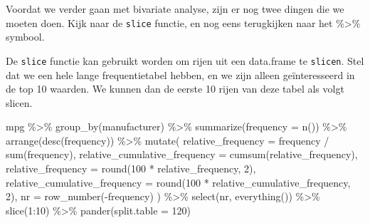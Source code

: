 \documentclass[]{tufte-book}
\newenvironment{Shaded}{}{}
\newcommand{\AttributeTok}[1]{\textcolor[rgb]{0.49,0.56,0.16}{#1}}
\newcommand{\DecValTok}[1]{\textcolor[rgb]{0.25,0.63,0.44}{#1}}
\newcommand{\FunctionTok}[1]{\textcolor[rgb]{0.02,0.16,0.49}{#1}}
\newcommand{\NormalTok}[1]{#1}
\newcommand{\SpecialCharTok}[1]{\textcolor[rgb]{0.25,0.44,0.63}{#1}}
\begin{document}
Voordat we verder gaan met bivariate analyse, zijn er nog twee dingen die we moeten doen. Kijk naar de \texttt{slice} functie, en nog eens terugkijken naar het \%\textgreater\% symbool.

De \texttt{slice} functie kan gebruikt worden om rijen uit een data.frame te \texttt{slicen}. Stel dat we een hele lange frequentietabel hebben, en we zijn alleen geïnteresseerd in de top 10 waarden. We kunnen dan de eerste 10 rijen van deze tabel als volgt slicen.

\begin{Shaded}
\begin{Highlighting}[]
\NormalTok{mpg }\SpecialCharTok{\%\textgreater{}\%}
  \FunctionTok{group\_by}\NormalTok{(manufacturer) }\SpecialCharTok{\%\textgreater{}\%}
  \FunctionTok{summarize}\NormalTok{(}\AttributeTok{frequency =} \FunctionTok{n}\NormalTok{()) }\SpecialCharTok{\%\textgreater{}\%}
  \FunctionTok{arrange}\NormalTok{(}\FunctionTok{desc}\NormalTok{(frequency)) }\SpecialCharTok{\%\textgreater{}\%}
  \FunctionTok{mutate}\NormalTok{(}
    \AttributeTok{relative\_frequency =}\NormalTok{ frequency }\SpecialCharTok{/} \FunctionTok{sum}\NormalTok{(frequency),}
    \AttributeTok{relative\_cumulative\_frequency =} \FunctionTok{cumsum}\NormalTok{(relative\_frequency),}
    \AttributeTok{relative\_frequency =} \FunctionTok{round}\NormalTok{(}\DecValTok{100} \SpecialCharTok{*}\NormalTok{ relative\_frequency, }\DecValTok{2}\NormalTok{),}
    \AttributeTok{relative\_cumulative\_frequency =} \FunctionTok{round}\NormalTok{(}\DecValTok{100} \SpecialCharTok{*}\NormalTok{ relative\_cumulative\_frequency, }\DecValTok{2}\NormalTok{),}
    \AttributeTok{nr =} \FunctionTok{row\_number}\NormalTok{(}\SpecialCharTok{{-}}\NormalTok{frequency)}
\NormalTok{  ) }\SpecialCharTok{\%\textgreater{}\%}
  \FunctionTok{select}\NormalTok{(nr, }\FunctionTok{everything}\NormalTok{()) }\SpecialCharTok{\%\textgreater{}\%}
  \FunctionTok{slice}\NormalTok{(}\DecValTok{1}\SpecialCharTok{:}\DecValTok{10}\NormalTok{) }\SpecialCharTok{\%\textgreater{}\%}
  \FunctionTok{pander}\NormalTok{(}\AttributeTok{split.table =} \DecValTok{120}\NormalTok{)}
\end{Highlighting}
\end{Shaded}
\end{document}
